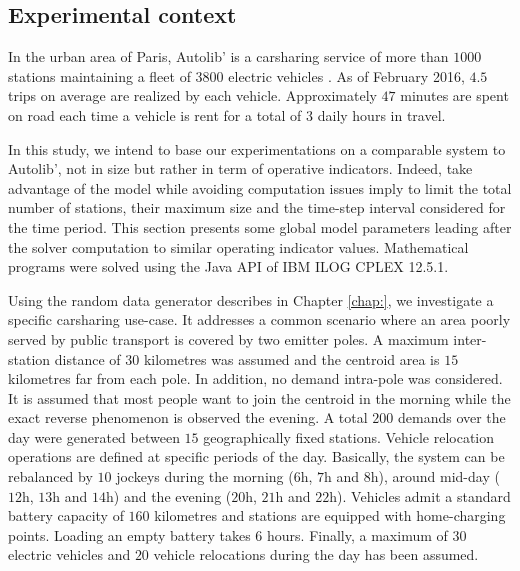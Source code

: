 \begin{bibunit}[ieeetr]
\section{Experimental context} \label{sec:energyExp:context}
In the urban area of Paris, Autolib' is a carsharing service of more than $1000$ stations maintaining a fleet of $3800$ electric vehicles \cite{autolib_chiffres_2016}.
As of February 2016, $4.5$ trips on average are realized by each vehicle.
Approximately $47$ minutes are spent on road each time a vehicle is rent for a total of $3$ daily hours in travel.

\medskip
In this study, we intend to base our experimentations on a comparable system to Autolib', not in size but rather in term of operative indicators.
Indeed, take advantage of the {\ENERGY} model while avoiding computation issues imply to limit the total number of stations, their maximum size and the time-step interval considered for the time period. %
This section presents some global model parameters leading after the solver computation to similar operating indicator values.
Mathematical programs were solved using the Java API of IBM ILOG CPLEX 12.5.1.

\medskip
Using the random data generator describes in Chapter \ref{chap:}, we investigate a specific carsharing use-case.
It addresses a common scenario where an area poorly served by public transport is covered by two emitter poles.
A maximum inter-station distance of $30$ kilometres was assumed and the centroid area is $15$ kilometres far from each pole.
In addition, no demand intra-pole was considered.
It is assumed that most people want to join the centroid in the morning while the exact reverse phenomenon is observed the evening.
A total $200$ demands over the day were generated between $15$ geographically fixed stations.
Vehicle relocation operations are defined at specific periods of the day.
Basically, the system can be rebalanced by $10$ jockeys during the morning ($6$h, $7$h and $8$h), around mid-day ($12$h, $13$h and $14$h) and the evening ($20$h, $21$h and $22$h).
Vehicles admit a standard battery capacity of $160$ kilometres and stations are equipped with home-charging points.
Loading an empty battery takes $6$ hours.
Finally, a maximum of $30$ electric vehicles and $20$ vehicle relocations during the day has been assumed.


\end{bibunit}
